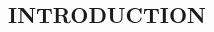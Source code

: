 \documentclass{stdj}
\renewcommand{\ArticleTitle}{\lipsum[1][1-2]}
\begin{document}
\rmfamily
\title{\ArticleTitle}
\pagestyle{FancyNotFirstPage}
\thispagestyle{FancyFirstPage}

\MakeSideBar
\MakeAbstract

\begin{multicols}{2}%
    \section*{INTRODUCTION}%
    \vspace{0pt}%
    \lipsum[1-2]
\end{multicols}

\noindent%
\begin{abstract}
    Abstract content.
\end{abstract}
\par
\sfdefault\\\rmdefault\\\ttdefault
\end{document}
